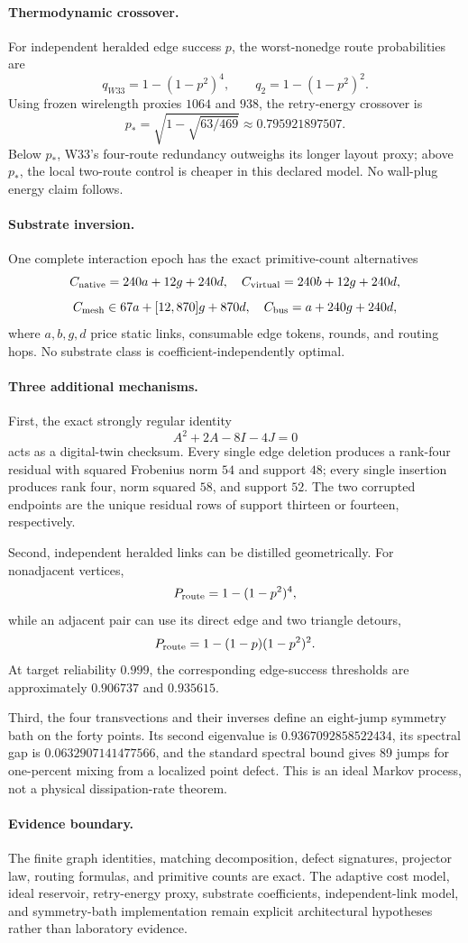 \paragraph{Thermodynamic crossover.}
For independent heralded edge success $p$, the worst-nonedge route probabilities are
\[
q_{W33}=1-(1-p^2)^4,
\qquad
q_2=1-(1-p^2)^2.
\]
Using frozen wirelength proxies $1064$ and $938$, the retry-energy crossover is
\[
p_*=\sqrt{1-\sqrt{63/469}}\approx0.795921897507.
\]
Below $p_*$, W33's four-route redundancy outweighs its longer layout proxy; above $p_*$, the local two-route control is cheaper in this declared model.  No wall-plug energy claim follows.

\paragraph{Substrate inversion.}
One complete interaction epoch has the exact primitive-count alternatives
\[
C_{\rm native}=240a+12g+240d,
\quad
C_{\rm virtual}=240b+12g+240d,
\]
\[
C_{\rm mesh}\in67a+[12,870]g+870d,
\quad
C_{\rm bus}=a+240g+240d,
\]
where $a,b,g,d$ price static links, consumable edge tokens, rounds, and routing hops.  No substrate class is coefficient-independently optimal.

\paragraph{Three additional mechanisms.}
First, the exact strongly regular identity
\[
A^2+2A-8I-4J=0
\]
acts as a digital-twin checksum.  Every single edge deletion produces a rank-four residual with squared Frobenius norm $54$ and support $48$; every single insertion produces rank four, norm squared $58$, and support $52$.  The two corrupted endpoints are the unique residual rows of support thirteen or fourteen, respectively.

Second, independent heralded links can be distilled geometrically.  For nonadjacent vertices,
\[
P_{\rm route}=1-(1-p^2)^4,
\]
while an adjacent pair can use its direct edge and two triangle detours,
\[
P_{\rm route}=1-(1-p)(1-p^2)^2.
\]
At target reliability $0.999$, the corresponding edge-success thresholds are approximately $0.906737$ and $0.935615$.

Third, the four transvections and their inverses define an eight-jump symmetry bath on the forty points.  Its second eigenvalue is $0.9367092858522434$, its spectral gap is $0.0632907141477566$, and the standard spectral bound gives 89 jumps for one-percent mixing from a localized point defect.  This is an ideal Markov process, not a physical dissipation-rate theorem.

\paragraph{Evidence boundary.}
The finite graph identities, matching decomposition, defect signatures, projector law, routing formulas, and primitive counts are exact.  The adaptive cost model, ideal reservoir, retry-energy proxy, substrate coefficients, independent-link model, and symmetry-bath implementation remain explicit architectural hypotheses rather than laboratory evidence.
